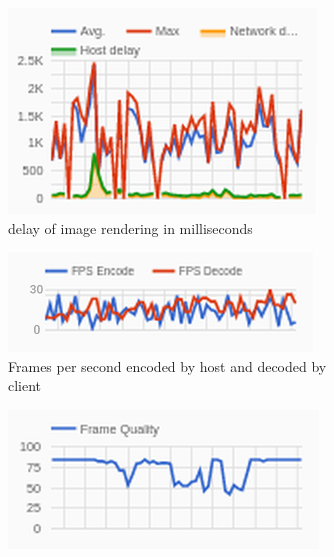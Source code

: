 \begin{figure}[h]
  \begin{subfigure}{.33\textwidth}
    \centering
    \includegraphics[width=1\linewidth]{Figures/crd/delay}
    \captionsetup{width=.85\linewidth}
    \caption{delay of image rendering in milliseconds}
    \label{fig:crdDelay}
  \end{subfigure}%
  \begin{subfigure}{.33\textwidth}
    \centering
    \includegraphics[width=1\linewidth]{Figures/crd/fps}
    \captionsetup{width=.85\linewidth}
    \caption{Frames per second encoded by host and decoded by client}
    \label{fig:crdFPS}
  \end{subfigure}%
  \begin{subfigure}{.33\textwidth}
    \centering
    \includegraphics[width=1\linewidth]{Figures/crd/quality}

\end{subfigure}
\end{figure}
